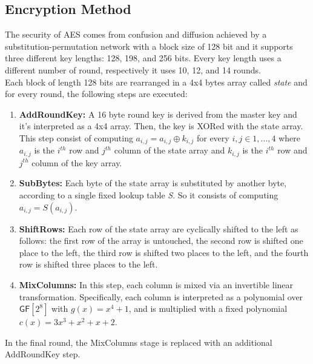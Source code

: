\subsection{Encryption Method}
The security of AES comes from confusion and diffusion achieved by a substitution-permutation network with a block size of 128 bit and it supports three different key lengths: 128, 198, and 256 bits. Every key length uses a different number of round, respectively it uses 10, 12, and 14 rounds.\\
Each block of length 128 bits are rearranged in a 4x4 bytes array called \emph{state} and for every round, the following steps are executed:
\begin{enumerate}
    \item{\textbf{AddRoundKey:} A 16 byte round key is derived from the master key and it's interpreted as a 4x4 array. Then, the key is XORed with the state array.\\This step consist of computing $a_{i,j} = a_{i,j} \oplus k_{i,j}$ for every $i,j \in {1,...,4}$ where $a_{i,j}$ is the $i^{th}$ row and $j^{th}$ column of the state array and $k_{i,j}$ is the $i^{th}$ row and $j^{th}$ column of the key array.}
    \item{\textbf{SubBytes:} Each byte of the state array is substituted by another byte, according to a single fixed lookup table \emph{S}. So it consists of computing $a_{i,j} = S(a_{i,j})$.}
    \item{\textbf{ShiftRows:} Each row of the state array are cyclically shifted to the left as follows: the first row of the array is untouched, the second row is shifted one place to the left, the third row is shifted two places to the left, and the fourth row is shifted three places to the left.}
    \item{\textbf{MixColumns:} In this step, each column is mixed via an invertible linear transformation. Specifically, each column is interpreted as a polynomial over $\mathsf{GF}[2^8]$ with $g(x) = x^4 + 1$, and is multiplied with a fixed polynomial $c(x) = 3x^3 + x^2 + x + 2$.}
\end{enumerate}
In the final round, the MixColumns stage is replaced with an additional AddRoundKey step.
